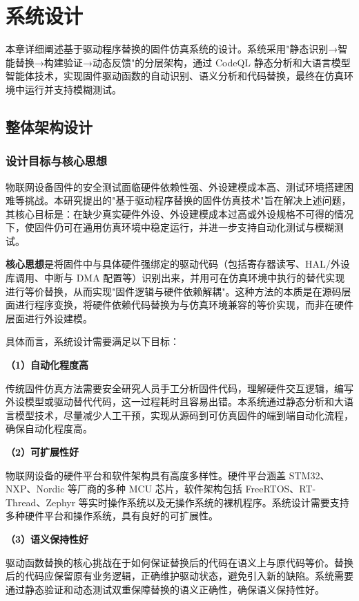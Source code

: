 \chapter{系统设计}
\label{chap:design}

本章详细阐述基于驱动程序替换的固件仿真系统的设计。系统采用"静态识别→智能替换→构建验证→动态反馈"的分层架构，通过 CodeQL 静态分析和大语言模型智能体技术，实现固件驱动函数的自动识别、语义分析和代码替换，最终在仿真环境中运行并支持模糊测试。

\section{整体架构设计}
\label{sec:arch}

\subsection{设计目标与核心思想}

物联网设备固件的安全测试面临硬件依赖性强、外设建模成本高、测试环境搭建困难等挑战。本研究提出的"基于驱动程序替换的固件仿真技术"旨在解决上述问题，其核心目标是：在缺少真实硬件外设、外设建模成本过高或外设规格不可得的情况下，使固件仍可在通用仿真环境中稳定运行，并进一步支持自动化测试与模糊测试。

\textbf{核心思想}是将固件中与具体硬件强绑定的驱动代码（包括寄存器读写、HAL/外设库调用、中断与 DMA 配置等）识别出来，并用可在仿真环境中执行的替代实现进行等价替换，从而实现"固件逻辑与硬件依赖解耦"。这种方法的本质是在源码层面进行程序变换，将硬件依赖代码替换为与仿真环境兼容的等价实现，而非在硬件层面进行外设建模。

具体而言，系统设计需要满足以下目标：

\textbf{（1）自动化程度高}

传统固件仿真方法需要安全研究人员手工分析固件代码，理解硬件交互逻辑，编写外设模型或驱动替代代码，这一过程耗时且容易出错。本系统通过静态分析和大语言模型技术，尽量减少人工干预，实现从源码到可仿真固件的端到端自动化流程，确保自动化程度高。

\textbf{（2）可扩展性好}

物联网设备的硬件平台和软件架构具有高度多样性。硬件平台涵盖 STM32、NXP、Nordic 等厂商的多种 MCU 芯片，软件架构包括 FreeRTOS、RT-Thread、Zephyr 等实时操作系统以及无操作系统的裸机程序。系统设计需要支持多种硬件平台和操作系统，具有良好的可扩展性。

\textbf{（3）语义保持性好}

驱动函数替换的核心挑战在于如何保证替换后的代码在语义上与原代码等价。替换后的代码应保留原有业务逻辑，正确维护驱动状态，避免引入新的缺陷。系统需要通过静态验证和动态测试双重保障替换的语义正确性，确保语义保持性好。

